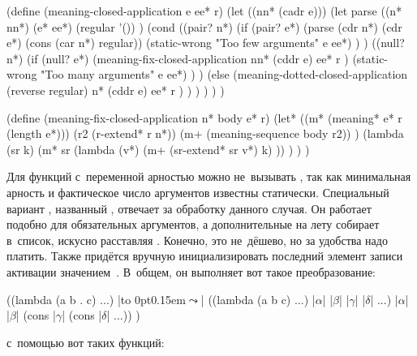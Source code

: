\begin{code:lisp}
(define (meaning-closed-application e ee* r)
  (let ((nn* (cadr e)))
    (let parse ((n* nn*)
                (e* ee*)
                (regular '()) )
      (cond ((pair? n*)
             (if (pair? e*)
                 (parse (cdr n*) (cdr e*) (cons (car n*) regular))
                 (static-wrong "Too few arguments" e ee*) ) )
            ((null? n*)
             (if (null? e*)
                 (meaning-fix-closed-application
                  nn* (cddr e) ee* r )
                 (static-wrong "Too many arguments" e ee*) ) )
            (else
             (meaning-dotted-closed-application
              (reverse regular) n* (cddr e) ee* r ) ) ) ) ) )

(define (meaning-fix-closed-application n* body e* r)
  (let* ((m* (meaning* e* r (length e*)))
         (r2 (r-extend* r n*))
         (m+ (meaning-sequence body r2)) )
    (lambda (sr k)
      (m* sr (lambda (v*)
               (m+ (sr-extend* sr v*) k) )) ) ) )
\end{code:lisp}

Для функций с~переменной арностью можно не~вызывать , так как
минимальная арность и фактическое число аргументов известны статически.
Специальный вариант , названный , отвечает за
обработку данного случая. Он работает подобно  для обязательных
аргументов, а дополнительные на лету собирает в~список, искусно расставляя
. Конечно, это не~дёшево, но за удобства надо платить. Также придётся
вручную инициализировать последний элемент записи активации значением~\ic{()}.
В~общем, он выполняет вот такое преобразование:

{\def\a{$\alpha$}\def\b{$\beta$}\def\g{$\gamma$}\def\d{$\delta$}%
\def\E{\hbox to 0pt{\kern0.15em$\leadsto$}}
\begin{code:lisp}
((lambda (a b . c) ...) |\E|   ((lambda (a b c) ...)
 |\a| |\b| |\g| |\d| ...)               |\a| |\b| (cons |\g| (cons |\d| ...)) )
\end{code:lisp}}

\noindent
с~помощью вот таких функций:

